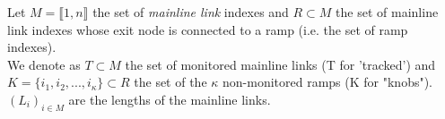 Let $M=\llbracket 1,n \rrbracket$ the set of \emph{mainline link} indexes and $R\subset{M}$ the set of mainline link indexes whose exit node is connected to a ramp (i.e. the set of ramp indexes). \\
We denote as $T\subset{M}$ the set of monitored mainline links  (T for 'tracked') and $K=\{ i_{1},i_{2},...,i_{\kappa}\}\subset{R}$ the set of the $\kappa$ non-monitored ramps (K for "knobs").\\
$(L_{i})_{i\in M}$ are the lengths of the mainline links.\\